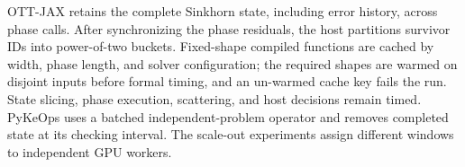 OTT-JAX retains the complete Sinkhorn state, including error history, across phase calls. After synchronizing the phase residuals, the host partitions survivor IDs into power-of-two buckets. Fixed-shape compiled functions are cached by width, phase length, and solver configuration; the required shapes are warmed on disjoint inputs before formal timing, and an un-warmed cache key fails the run. State slicing, phase execution, scattering, and host decisions remain timed. PyKeOps uses a batched independent-problem operator and removes completed state at its checking interval. The scale-out experiments assign different windows to independent GPU workers.
